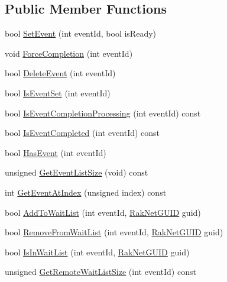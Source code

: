 \subsection*{Public Member Functions}
\begin{DoxyCompactItemize}
\item 
bool \hyperlink{class_rak_net_1_1_ready_event_af7caed0bdee19e21bdd91ff34ff73b31}{Set\-Event} (int event\-Id, bool is\-Ready)
\item 
void \hyperlink{class_rak_net_1_1_ready_event_abc3c01527d0faf6b47e43ce0e3a0159c}{Force\-Completion} (int event\-Id)
\item 
bool \hyperlink{class_rak_net_1_1_ready_event_ab8b4e32689f5c54d0ce7c6deed2eb7e6}{Delete\-Event} (int event\-Id)
\item 
bool \hyperlink{class_rak_net_1_1_ready_event_a3e316ae7568001e5c2d9624f156a2ee8}{Is\-Event\-Set} (int event\-Id)
\item 
bool \hyperlink{class_rak_net_1_1_ready_event_a90747ab26a89d426317dfa1d4f414fde}{Is\-Event\-Completion\-Processing} (int event\-Id) const 
\item 
bool \hyperlink{class_rak_net_1_1_ready_event_a8c4600be8271b798ea0158cef9261462}{Is\-Event\-Completed} (int event\-Id) const 
\item 
bool \hyperlink{class_rak_net_1_1_ready_event_ad10f179c0565882651ca2bde5bf50a45}{Has\-Event} (int event\-Id)
\item 
unsigned \hyperlink{class_rak_net_1_1_ready_event_ad56242dec80dd75f05c1eb96458e0bf8}{Get\-Event\-List\-Size} (void) const 
\item 
int \hyperlink{class_rak_net_1_1_ready_event_adb53c9c21d8e88b1a5fbb3e241fe5f91}{Get\-Event\-At\-Index} (unsigned index) const 
\item 
bool \hyperlink{class_rak_net_1_1_ready_event_aaf6bfa53f4be43cb4d9fe40911faefdf}{Add\-To\-Wait\-List} (int event\-Id, \hyperlink{struct_rak_net_1_1_rak_net_g_u_i_d}{Rak\-Net\-G\-U\-I\-D} guid)
\item 
bool \hyperlink{class_rak_net_1_1_ready_event_ae7cb534890f2ab044f2b81e9b3205bc8}{Remove\-From\-Wait\-List} (int event\-Id, \hyperlink{struct_rak_net_1_1_rak_net_g_u_i_d}{Rak\-Net\-G\-U\-I\-D} guid)
\item 
bool \hyperlink{class_rak_net_1_1_ready_event_a1b1d658e1be6b128b013c20eed2bf580}{Is\-In\-Wait\-List} (int event\-Id, \hyperlink{struct_rak_net_1_1_rak_net_g_u_i_d}{Rak\-Net\-G\-U\-I\-D} guid)
\item 
unsigned \hyperlink{class_rak_net_1_1_ready_event_ab620a94cd56f7a6a82aa5e680322cb89}{Get\-Remote\-Wait\-List\-Size} (int event\-Id) const 

\end{DoxyCompactItemize}
